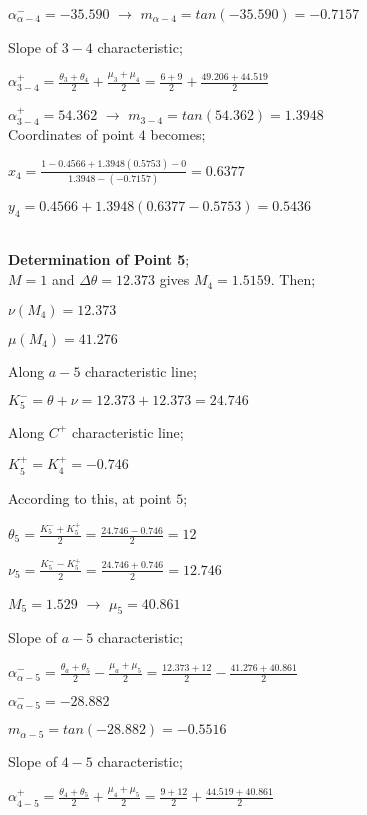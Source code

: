 \begin{appendices}
${\alpha}_{\alpha-4}^{-} = -35.590 $ $\rightarrow$  $m_{\alpha-4} = tan(-35.590) = -0.7157$

Slope of $3-4$ characteristic;

${\alpha}^{+}_{3-4} = \frac{\theta_3+\theta_4}{2}+\frac{\mu_3+\mu_4}{2} = \frac{6+9}{2}+\frac{49.206+44.519}{2}$

${\alpha}_{3-4}^{+} = 54.362 $ $\rightarrow$  $m_{3-4} = tan(54.362) = 1.3948$\\

Coordinates of point $4$ becomes;\\

{\color{magenta}
	$x_4 = \frac{1-0.4566+1.3948(0.5753)-0}{1.3948-(-0.7157)} = 0.6377 $
	
	$y_4 = 0.4566+1.3948(0.6377-0.5753)=0.5436$
}\\

\noindent\textbf{Determination of Point 5};\\

$M=1$ and $\Delta\theta = 12.373$ gives $M_4=1.5159$. Then;

$\nu(M_4)=12.373$

$\mu(M_4)=41.276$

Along $a-5$ characteristic line;

$K_5^- = \theta + \nu = 12.373 + 12.373 = 24.746$

Along $C^+$ characteristic line;

$K_5^+ = K_4^+ = -0.746$

According to this, at point $5$;

$\theta_5 = \frac{K_5^-+K_5^+}{2} = \frac{24.746-0.746}{2} = 12$

$\nu_5 = \frac{K_5^--K_5^+}{2} = \frac{24.746+0.746}{2} = 12.746$

$M_5 = 1.529$	$\rightarrow$	$\mu_5 = 40.861$

\pagebreak

\begin{minipage}{0.65\textwidth}
	
Slope of $a-5$ characteristic;

${\alpha}^{-}_{\alpha-5} = \frac{\theta_a+\theta_5}{2}-\frac{\mu_a+\mu_5}{2} = \frac{12.373+12}{2}-\frac{41.276+40.861}{2}$

${\alpha}_{\alpha-5}^{-} = -28.882 $   

$m_{\alpha-5} = tan(-28.882) = -0.5516$

Slope of $4-5$ characteristic;

${\alpha}^{+}_{4-5} = \frac{\theta_4+\theta_5}{2}+\frac{\mu_4+\mu_5}{2} = \frac{9+12}{2}+\frac{44.519+40.861}{2}$


\end{minipage}
\end{appendices}
